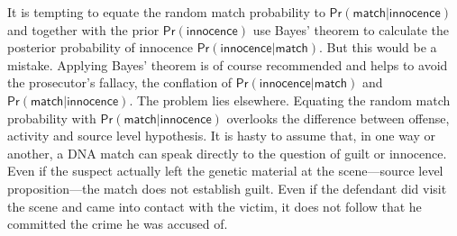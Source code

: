 \documentclass{article}
\newcommand{\pr}{\mathsf{Pr}}
\begin{document}
%
%
%
%
It is tempting to 
equate the random match probability to $\pr(\textsf{match} \vert \textsf{innocence})$ and together with the prior $\pr(\textsf{innocence})$ use 
Bayes' theorem to calculate  
the posterior probability of innocence $\pr(\textsf{innocence} \vert \textsf{match})$. But
this would be a mistake.
%
Applying Bayes' theorem is of course recommended and helps to avoid the prosecutor's fallacy, the conflation of $\pr(\textsf{innocence} \vert \textsf{match})$ and $\pr(\textsf{match} \vert \textsf{innocence})$.
The problem lies elsewhere. 
Equating the random match probability with $\pr(\textsf{match} \vert \textsf{innocence})$ overlooks the difference between offense, activity and source level hypothesis. It is hasty to assume that, in one way or another, a DNA match can speak directly to the question of guilt or innocence.  Even if the suspect actually left the genetic material at the scene---source level proposition---the match does not establish guilt. %
Even if the defendant did visit the scene and came into contact with the victim, it does not follow that he committed the crime he was accused of. 
\end{document}
